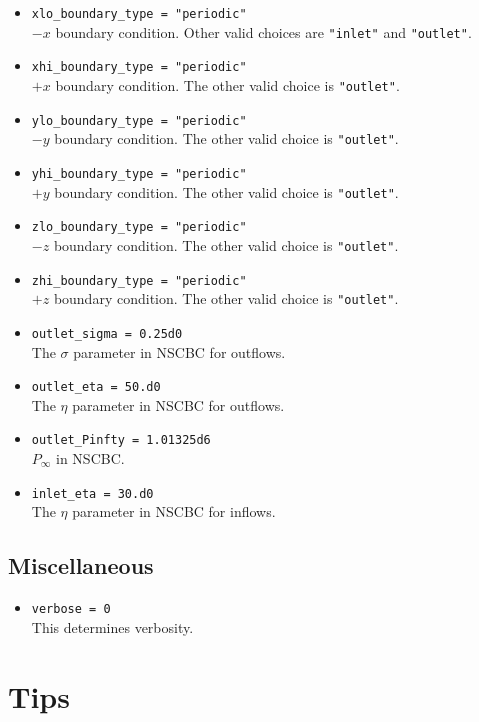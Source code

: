 \documentclass[11pt,letterpaper]{article}
\begin{document}
\begin{itemize}
\item {\tt xlo\_boundary\_type = "periodic"}\\
  $-x$ boundary condition.  Other valid choices are {\tt "inlet"} and
  {\tt "outlet"}.
\item {\tt xhi\_boundary\_type = "periodic"}\\
  $+x$ boundary condition.  The other valid choice is {\tt "outlet"}.
\item {\tt ylo\_boundary\_type = "periodic"}\\
  $-y$ boundary condition.  The other valid choice is {\tt "outlet"}.
\item {\tt yhi\_boundary\_type = "periodic"}\\
  $+y$ boundary condition.  The other valid choice is {\tt "outlet"}.
\item {\tt zlo\_boundary\_type = "periodic"}\\
  $-z$ boundary condition.  The other valid choice is {\tt "outlet"}.
\item {\tt zhi\_boundary\_type = "periodic"}\\
  $+z$ boundary condition.  The other valid choice is {\tt "outlet"}.
\item {\tt outlet\_sigma = 0.25d0}\\
  The $\sigma$ parameter in NSCBC for outflows.
\item {\tt outlet\_eta = 50.d0}\\
  The $\eta$ parameter in NSCBC for outflows.
\item {\tt outlet\_Pinfty = 1.01325d6}\\
  $P_\infty$ in NSCBC.
\item {\tt inlet\_eta = 30.d0}\\
  The $\eta$ parameter in NSCBC for inflows.
\end{itemize}

\subsection{Miscellaneous}

\begin{itemize}
\item {\tt verbose = 0}\\
  This determines verbosity.
\end{itemize}

\section{Tips}
\end{document}
